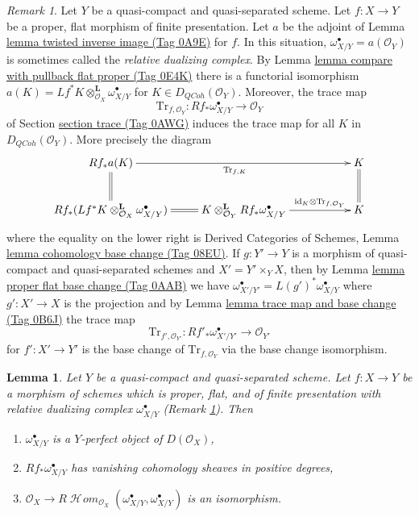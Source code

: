 \documentclass{amsart}
\theoremstyle{plain}
\newtheorem{lemma}[subsection]{Lemma}
\theoremstyle{definition}
\theoremstyle{remark}
\newtheorem{remark}[subsection]{Remark}
\numberwithin{equation}{subsection}
\def\SheafHom{\mathop{\mathcal{H}\!\mathit{om}}\nolimits}
\def\QCoh{\mathit{QCoh}}
\begin{document}
\begin{remark}
\label{remark-relative-dualizing-complex}
Let $Y$ be a quasi-compact and quasi-separated scheme.
Let $f : X \to Y$ be a proper, flat morphism of finite presentation.
Let $a$ be the adjoint of Lemma \href{https://stacks.math.columbia.edu/tag/0A9E}{lemma twisted inverse image (Tag 0A9E)} for $f$.
In this situation, $\omega_{X/Y}^\bullet = a(\mathcal{O}_Y)$
is sometimes called the {\it relative dualizing complex}. By
Lemma \href{https://stacks.math.columbia.edu/tag/0E4K}{lemma compare with pullback flat proper (Tag 0E4K)}
there is a functorial isomorphism
$a(K) = Lf^*K \otimes_{\mathcal{O}_X}^\mathbf{L} \omega_{X/Y}^\bullet$
for $K \in D_\QCoh(\mathcal{O}_Y)$. Moreover, the trace map
$$
\text{Tr}_{f, \mathcal{O}_Y} : Rf_*\omega_{X/Y}^\bullet \to \mathcal{O}_Y
$$
of Section \href{https://stacks.math.columbia.edu/tag/0AWG}{section trace (Tag 0AWG)} induces the trace map for all $K$
in $D_\QCoh(\mathcal{O}_Y)$. More precisely the diagram
$$
\xymatrix{
Rf_*a(K) \ar[rrr]_{\text{Tr}_{f, K}} \ar@{=}[d] & & &
K \ar@{=}[d] \\
Rf_*(Lf^*K \otimes_{\mathcal{O}_X}^\mathbf{L} \omega_{X/Y}^\bullet)
\ar@{=}[r] &
K \otimes_{\mathcal{O}_Y}^\mathbf{L} Rf_*\omega_{X/Y}^\bullet
\ar[rr]^-{\text{id}_K \otimes \text{Tr}_{f, \mathcal{O}_Y}} & & K
}
$$
where the equality on the lower right is
Derived Categories of Schemes, Lemma \href{https://stacks.math.columbia.edu/tag/08EU}{lemma cohomology base change (Tag 08EU)}.
If $g : Y' \to Y$ is a
morphism of quasi-compact and quasi-separated schemes
and $X' = Y' \times_Y X$, then by
Lemma \href{https://stacks.math.columbia.edu/tag/0AAB}{lemma proper flat base change (Tag 0AAB)} we have
$\omega_{X'/Y'}^\bullet = L(g')^*\omega_{X/Y}^\bullet$ where $g' : X' \to X$
is the projection and by Lemma \href{https://stacks.math.columbia.edu/tag/0B6J}{lemma trace map and base change (Tag 0B6J)}
the trace map
$$
\text{Tr}_{f', \mathcal{O}_{Y'}} :
Rf'_*\omega_{X'/Y'}^\bullet \to \mathcal{O}_{Y'}
$$
for $f' : X' \to Y'$ is the base change of $\text{Tr}_{f, \mathcal{O}_Y}$
via the base change isomorphism.
\end{remark}

\begin{lemma}
\label{lemma-properties-relative-dualizing}
Let $Y$ be a quasi-compact and quasi-separated scheme.
Let $f : X \to Y$ be a morphism of schemes which is
proper, flat, and of finite presentation with
relative dualizing complex $\omega_{X/Y}^\bullet$
(Remark \ref{remark-relative-dualizing-complex}).
Then
\begin{enumerate}
\item $\omega_{X/Y}^\bullet$ is a $Y$-perfect object of $D(\mathcal{O}_X)$,
\item $Rf_*\omega_{X/Y}^\bullet$ has vanishing cohomology sheaves
in positive degrees,
\item $\mathcal{O}_X \to
R\SheafHom_{\mathcal{O}_X}(\omega_{X/Y}^\bullet, \omega_{X/Y}^\bullet)$
is an isomorphism.
\end{enumerate}
\end{lemma}
\end{document}
